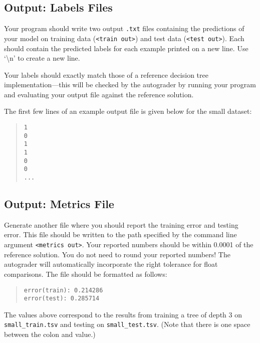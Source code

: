\documentclass[11pt,addpoints,answers]{exam}
\begin{document}
\subsection{Output: Labels Files}
\label{sec:labels}

Your program should write two output \lstinline{.txt} files containing the predictions of your model on training data (\lstinline{<train out>}) and test data (\lstinline{<test out>}). Each should contain the predicted labels for each example printed on a new line. Use `\textbackslash n' to create a new line.

Your labels should exactly match those of a reference decision tree implementation---this will be checked by the autograder by running your program and evaluating your output file against the reference solution.

%
The first few lines of an example output file is given below for the small dataset:
\begin{quote}
\begin{verbatim}
1
0
1
1
0
0
...
\end{verbatim}
\end{quote}

\subsection{Output: Metrics File}
\label{sec:metrics}

Generate another file where you should report the training error and testing error. This file should be written to the path specified by the command line argument \lstinline{<metrics out>}. Your reported numbers should be within 0.0001 of the reference solution. You do not need to round your reported numbers! The autograder will automatically incorporate the right tolerance for float comparisons. The file should be formatted as follows:

\begin{quote}
\begin{verbatim}
error(train): 0.214286
error(test): 0.285714
\end{verbatim}
\end{quote}

The values above correspond to the results from training a tree of depth 3 on \texttt{small\_train.tsv} and testing on \texttt{small\_test.tsv}. (Note that there is one space between the colon and value.)
\end{document}
